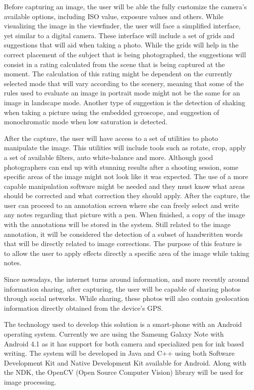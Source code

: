 Before capturing an image, the user will be able the fully customize the camera's available options, including ISO value, exposure values and others. While visualizing the image in the viewfinder, the user will face a simplified interface, yet similar to a digital camera. 
These interface will include a set of grids and suggestions that will aid when taking a photo. While the grids will help in the correct placement of the subject that is being photographed, the suggestions will consist in a rating calculated from the scene that is being captured at the moment. 
The calculation of this rating might be dependent on the currently selected mode that will vary according to the scenery, meaning that some of the rules used to evaluate an image in portrait mode might not be the same for an image in landscape mode. Another type of suggestion is the detection of shaking when taking a picture using the embedded gyroscope, and suggestion of monochromatic mode when low saturation is detected.

After the capture, the user will have access to a set of utilities to photo manipulate the image. This utilities will include tools such as rotate, crop, apply a set of available filters, auto white-balance and  more.
Although good photographers can end up with stunning results after a shooting session, some specific areas of the image might not look like it was expected. The use of a more capable manipulation software might be needed and they must know what areas should be corrected and what correction they should apply. After the capture, the user can proceed to an annotation screen where she can freely select and write any notes regarding that picture with a pen. When finished, a copy of the image with the annotations will be stored in the system. Still related to the image annotation, it will be considered the detection of a subset of handwritten words that will be directly related to image corrections. The purpose of this feature is to allow the user to apply effects directly a specific area of the image while taking notes.

Since nowadays, the internet turns around information, and more recently around information sharing, after capturing, the user will be capable of sharing photos through social networks. While sharing, these photos will also contain geolocation information directly obtained from the device's GPS.

The technology used to develop this solution is a smart-phone with an Android operating system. Currently we are using the Samsung Galaxy Note with Android 4.1 as it has support for both camera and specialized pen for ink based writing. The system will be developed in Java and C++ using both Software Development Kit \cite{SDK} and Native Development Kit \cite{NDK} available for Android.  Along with the NDK, the OpenCV (Open Source Computer Vision) \cite{OCV} library will be used for image processing.

